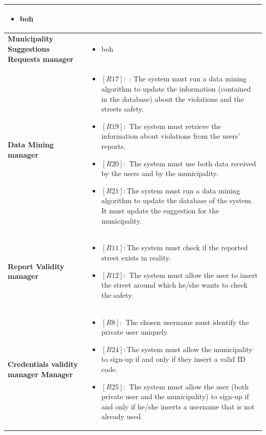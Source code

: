 \documentclass[titlepage]{article}
\begin{document}
\begin{longtable}{| p{7 cm} | p{8 cm} |}
\begin{itemize}
			\item boh
		\end{itemize} \\ \hline
		\newline \textbf {Municipality Suggestions Requests manager} &
		\begin{itemize}
			\item boh
		\end{itemize} \\ \hline
		\newline \textbf {Data Mining manager} &
		\begin{itemize}
			\item \textbf{$[R17]:$} : The system must run a data mining algorithm to update the information (contained in the database) about the violations and the streets safety. 
			\item \textbf{$[R19]:$} The system must retrieve the information about violations from the users' reports. 
			\item \textbf{$[R20]:$} The system must use both data received by the users and by the municipality. 
			\item \textbf{$[R21]:$}The system must run a data mining algorithm to update the database of the system. It must update the suggestion for the municipality. 
		\end{itemize} \\ \hline
		\newline \textbf {Report Validity manager} &
		\begin{itemize}
			\item \textbf{$[R11]:$}The system must check if the reported street exists in reality. 
			\item \textbf{$[R12]:$} The system must allow the user to insert the street around which he/she wants to check the safety. 
		\end{itemize} \\ \hline
		\newline \textbf {Credentials validity manager Manager} &
		\begin{itemize}
			\item \textbf{$[R8]:$} The chosen username must identify the private user uniquely. 
			\item \textbf{$[R24]:$}The system must allow the municipality to sign-up if and only if they insert a valid ID code. 
			\item \textbf{$[R25]:$} The system must allow the user (both private user and the municipality) to sign-up if and only if he/she inserts a username that is not already used.

\end{itemize}
\end{longtable}
\end{document}
